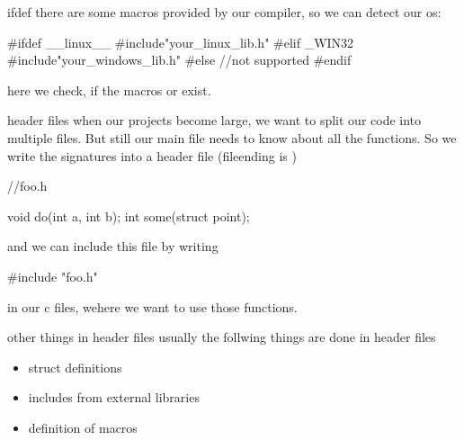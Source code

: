 \documentclass[10pt,graphics,aspectratio=169,table]{beamer}
\begin{document}
\begin{frame}[fragile]{ifdef}
there are some macros provided by our compiler, so we can detect our os:
\begin{codeblock}
#ifdef __linux__
    #include"your_linux_lib.h"
#elif _WIN32
    #include"your_windows_lib.h" 
#else
    //not supported
#endif
\end{codeblock}

here we check, if the macros  or  exist.
\end{frame}

\begin{frame}[fragile]{header files}
when our projects become large, we want to split our code into multiple files.
But still our main file needs to know about all the functions. So we write the
signatures into a header file (fileending is )

\begin{codeblock}
//foo.h

void do(int a, int b);
int some(struct point);
\end{codeblock}

and we can include this file by writing
\begin{codeblock}
#include "foo.h"
\end{codeblock}
in our c files, wehere we want to use those functions.
\end{frame}

\begin{frame}{other things in header files}
usually the follwing things are done in header files
\begin{itemize}
\item struct definitions
\item includes from external libraries
\item definition of macros
\end{itemize}
\end{frame}
\end{document}
